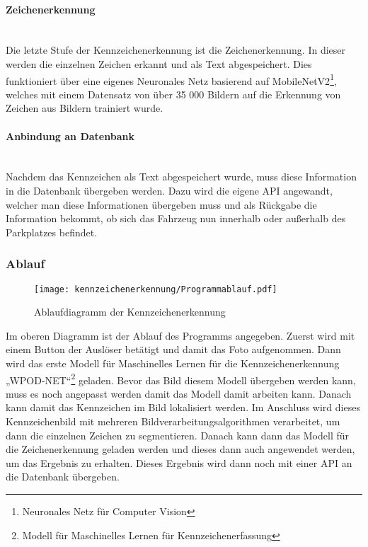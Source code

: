 \paragraph{Zeichenerkennung}\mbox{}\\
Die letzte Stufe der Kennzeichenerkennung ist die Zeichenerkennung. In dieser werden die einzelnen Zeichen erkannt und als Text 
abgespeichert. Dies funktioniert über eine eigenes Neuronales Netz basierend auf MobileNetV2\footnote{Neuronales Netz für Computer Vision}, welches mit einem Datensatz von 
über 35 000 Bildern auf die Erkennung von Zeichen aus Bildern trainiert wurde.

\paragraph{Anbindung an Datenbank}\mbox{}\\
Nachdem das Kennzeichen als Text abgespeichert wurde, muss diese Information in die Datenbank übergeben werden. Dazu wird die 
eigene API angewandt, welcher man diese Informationen übergeben muss und als Rückgabe die Information bekommt, ob sich das 
Fahrzeug nun innerhalb oder außerhalb des Parkplatzes befindet.

\subsubsection{Ablauf}

\begin{figure}[H]
    \centering
    \texttt{[image: kennzeichenerkennung/Programmablauf.pdf]}
    \caption{Ablaufdiagramm der Kennzeichenerkennung}
\end{figure}

Im oberen Diagramm ist der Ablauf des Programms angegeben. Zuerst wird mit einem Button der Auslöser betätigt und damit das 
Foto aufgenommen. Dann wird das erste Modell für Maschinelles Lernen für die Kennzeichenerkennung „WPOD-NET“\footnote{Modell für Maschinelles Lernen für Kennzeichenerfassung} geladen. Bevor das 
Bild diesem Modell übergeben werden kann, muss es noch angepasst werden damit das Modell damit arbeiten kann. Danach kann 
damit das Kennzeichen im Bild lokalisiert werden. Im Anschluss wird dieses Kennzeichenbild mit mehreren Bildverarbeitungsalgorithmen 
verarbeitet, um dann die einzelnen Zeichen zu segmentieren. Danach kann dann das Modell für die Zeichenerkennung geladen 
werden und dieses dann auch angewendet werden, um das Ergebnis zu erhalten. Dieses Ergebnis wird dann noch mit einer API an die Datenbank übergeben.

